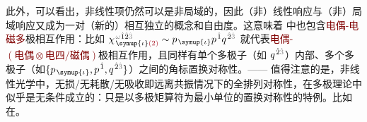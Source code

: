 此外，可以看出，非线性项仍然可以是非局域的，因此（非）线性响应与（非）局域响应又成为一对（新的）相互独立的概念和自由度。这意味着  中也包含\textcolor{Maroon}{电偶-电磁多}极相互作用：比如 $\chi^{\;\! \mathcolor{gray}{\omega} \hat{1} \hat{2} \mathcolor{gray}{\hat{3}}}_{\;\! \symup{\iota} \textcolor{Maroon}{(2)}} \sim p_{\;\! \symup{\iota}} p^{\;\! \hat{1}} q^{\;\! \hat{2} \mathcolor{gray}{\hat{3}}}$ 就代表\textcolor{Maroon}{电偶-$(\text{电偶}\otimes\text{电四/磁偶})$}极相互作用，且同样有单个多极子（如 $q^{\;\! \hat{2} \mathcolor{gray}{\hat{3}}}$）内部、多个{多极子}（如$\{p_{\;\! \symup{\iota}}, p^{\;\! \hat{1}}, q^{\;\! \hat{2} \mathcolor{gray}{\hat{3}}}\}$）之间的角标置换对称性。—— 值得注意的是，非线性光学中，无损/无耗散/无吸收即远离共振情况下的全排列对称性\cite{boydNonlinearOptics2019}，在多极理论中似乎是无条件成立的\cite{raabMultipoleTheoryElectromagnetism2004}：只是以多极矩算符为最小单位的置换对称性的特例。比如在。

